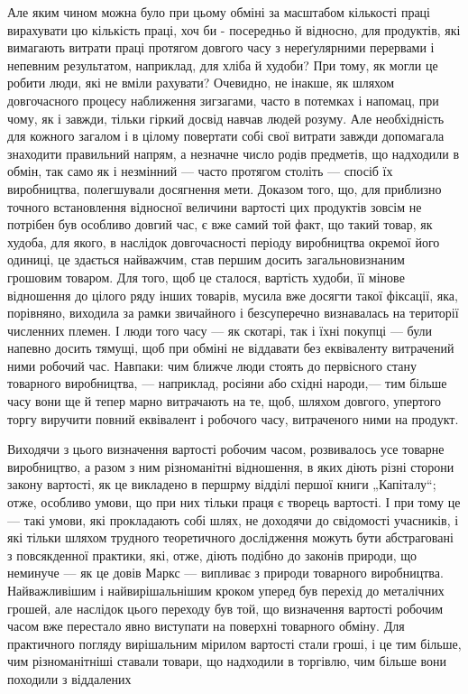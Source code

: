 Але яким чином можна було при цьому обміні за масштабом кількості праці вирахувати цю кількість праці, хоч би - посередньо й
відносно, для продуктів, які вимагають витрати праці протягом довгого часу з нереґулярними перервами і непевним результатом,
наприклад, для хліба й худоби? При тому, як могли це робити люди, які не вміли рахувати? Очевидно, не інакше, як шляхом
довгочасного процесу наближення зигзагами, часто в потемках і напомац, при чому, як і завжди, тільки гіркий досвід навчав
людей розуму. Але необхідність для кожного загалом і в цілому повертати собі свої витрати завжди допомагала знаходити
правильний напрям, а незначне число родів предметів, що надходили в обмін, так само як і незмінний — часто протягом століть
— спосіб їх виробництва, полегшували досягнення мети. Доказом того, що, для приблизно точного встановлення відносної
величини вартості цих продуктів зовсім не потрібен був особливо довгий час, є вже самий той факт, що такий товар, як худоба,
для якого, в наслідок довгочасності періоду виробництва окремої його одиниці, це здається найважчим, став першим досить
загальновизнаним грошовим товаром. Для того, щоб це сталося, вартість худоби, її мінове відношення до цілого ряду інших
товарів, мусила вже досягти такої фіксації, яка, порівняно, виходила за рамки звичайного і безсуперечно визнавалась на
території численних племен. І люди того часу — як скотарі, так і їхні покупці — були напевно досить тямущі, щоб при обміні
не віддавати без еквіваленту витрачений ними робочий час. Навпаки: чим ближче люди стоять до первісного стану товарного
виробництва, — наприклад, росіяни або східні народи,—  тим більше часу вони ще й тепер марно витрачають на те, щоб, шляхом
довгого, упертого торгу виручити повний еквівалент і робочого часу, витраченого ними на продукт.

Виходячи з цього визначення
вартості робочим часом, розвивалось усе товарне виробництво, а разом з ним різноманітні відношення, в яких діють різні
сторони закону вартості, як це викладено в першрму відділі першої книги „Капіталу“; отже, особливо умови, що при них
тільки праця є творець вартості. І при тому це — такі умови, які прокладають собі шлях, не доходячи до свідомості учасників,
і які тільки шляхом трудного теоретичного дослідження можуть бути абстраговані з повсякденної практики, які, отже, діють
подібно до законів природи, що неминуче — як це довів Маркс — випливає з природи товарного виробництва. Найважливішим і
найвирішальнішим кроком уперед був перехід до металічних грошей, але наслідок цього переходу був той, що визначення вартості
робочим часом вже перестало явно виступати на поверхні товарного обміну. Для практичного погляду вирішальним мірилом
вартості стали гроші, і це тим більше, чим різноманітніші ставали товари, що надходили в торгівлю, чим більше вони походили
з віддалених
\parbreak{}  %
